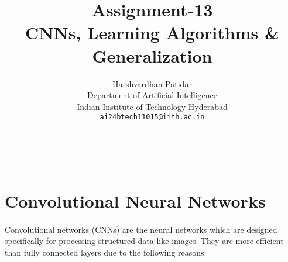 \documentclass{article}
\title{Assignment-13 \\ CNNs, Learning Algorithms \& Generalization}
\author{Harshvardhan Patidar\\
  Department of Artificial Intelligence\\
  Indian Institute of Technology Hyderabad\\
  \texttt{ai24btech11015@iith.ac.in}
}
\begin{document}
\



\maketitle


\section{Convolutional Neural Networks}
  \paragraph{} Convolutional networks (CNNs) are the neural networks which are designed specifically for processing structured data like images. They are more efficient than fully connected layers due to the following reasons: 
   
\end{document}
